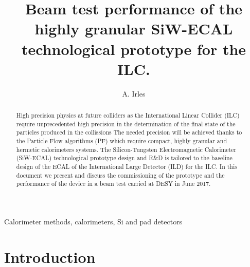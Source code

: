 \documentclass[final,3p,times,twocolumn]{elsarticle}
\begin{document}
\begin{frontmatter}
  \title{Beam test performance of the highly granular SiW-ECAL technological prototype for the ILC.}
  
\author{A. Irles}


\begin{keyword}
  Calorimeter methods, calorimeters, Si and pad detectors
\end{keyword}



\begin{abstract}
  High precision physics at future colliders as the International Linear Collider (ILC) require unprecedented high precision in the determination
  of the final state of the particles produced in the collissions
  The needed precision will be achieved thanks to the Particle Flow algorithms (PF) which require compact, highly granular and hermetic calorimeters systems.
  The Silicon-Tungsten Electromagnetic Calorimeter (SiW-ECAL) technological prototype
  design and R\&D is tailored to the baseline design of the ECAL of the International Large Detector (ILD) for the ILC.
  In this document we present and discuss the commissioning of the prototype
  and the performance of the device in a beam test carried at DESY in June 2017.
\end{abstract}

\end{frontmatter}

\linenumbers


\section{Introduction}
\end{document}
